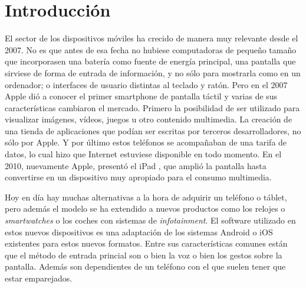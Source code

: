 \documentclass[
10pt, %
a4paper, %
oneside, %
headinclude,footinclude, %
BCOR5mm, %
]{scrartcl}
\begin{document}

{\let\thefootnote\relax{}}

{\let\thefootnote\relax{}}


\newpage %

\section{Introducción}
El sector de los dispositivos móviles ha crecido de manera muy relevante desde el 2007. No es que antes de esa fecha no hubiese computadoras de pequeño tamaño que incorporasen una batería como fuente de energía principal, una pantalla que sirviese de forma de entrada de información, y no sólo para mostrarla como en un ordenador; o interfaces de usuario distintas al teclado y ratón. Pero en el 2007 Apple dió a conocer el primer smartphone de pantalla táctil \cite{rob_price_how_2015} y varias de sus características cambiaron el mercado. Primero la posibilidad de ser utilizado para visualizar imágenes, vídeos, juegos u otro contenido multimedia. La creación de una tienda de aplicaciones que podían ser escritas por terceros desarrolladores, no sólo por Apple. Y por último estos teléfonos se acompañaban de una tarifa de datos, lo cual hizo que Internet estuviese disponible en todo momento. En el 2010, nuevamente Apple, presentó el iPad \cite{john_d._sutter_apple_2010}, que amplió la pantalla hasta convertirse en un dispositivo muy apropiado para el consumo multimedia.

Hoy en día hay muchas alternativas a la hora de adquirir un teléfono o táblet, pero además el modelo se ha extendido a nuevos productos como los relojes o \textit{smartwatches} o los coches con sistemas de \textit{infotainment}. El software utilizado en estos nuevos dispositivos es una adaptación de los sistemas Android o iOS existentes para estos nuevos formatos. Entre sus características comunes están que el método de entrada princial son o bien la voz o bien los gestos sobre la pantalla. Además son dependientes de un teléfono con el que suelen tener que estar emparejados.
\end{document}
